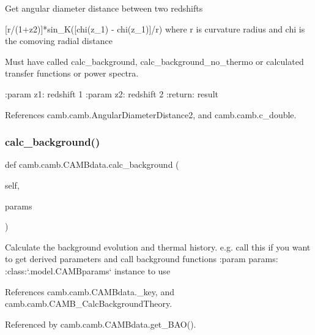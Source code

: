 \begin{DoxyVerb}Get angular diameter distance between two redshifts

[r/(1+z2)]*sin_K([chi(z_1) - chi(z_1)]/r) where r is curvature radius and chi is the comoving radial distance

Must have called calc_background, calc_background_no_thermo or calculated transfer functions or power spectra.

:param z1: redshift 1
:param z2: redshift 2
:return: result
\end{DoxyVerb}
 

References camb.\+camb.\+Angular\+Diameter\+Distance2, and camb.\+camb.\+c\+\_\+double.

\mbox{\label{classcamb_1_1camb_1_1CAMBdata_a93e9fcebd9c7adb98d59d3ace6cd94c7}} 
\subsubsection{\texorpdfstring{calc\+\_\+background()}{calc\_background()}}
{\footnotesize\ttfamily def camb.\+camb.\+C\+A\+M\+Bdata.\+calc\+\_\+background (\begin{DoxyParamCaption}\item[{}]{self,  }\item[{}]{params }\end{DoxyParamCaption})}

\begin{DoxyVerb}Calculate the background evolution and thermal history.
e.g. call this if you want to get derived parameters and call background functions
:param params:  :class:`.model.CAMBparams` instance to use
\end{DoxyVerb}
 

References camb.\+camb.\+C\+A\+M\+Bdata.\+\_\+key, and camb.\+camb.\+C\+A\+M\+B\+\_\+\+Calc\+Background\+Theory.



Referenced by camb.\+camb.\+C\+A\+M\+Bdata.\+get\+\_\+\+B\+A\+O().

